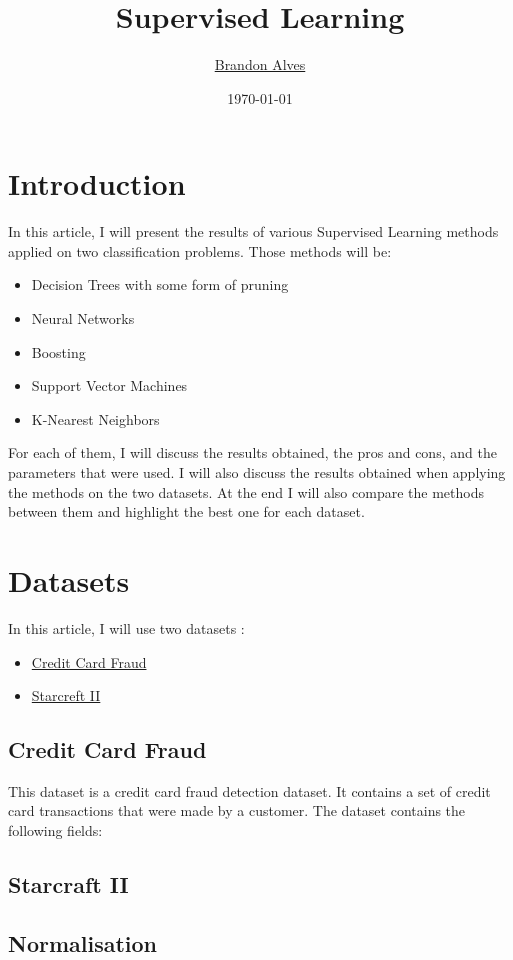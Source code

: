\documentclass[twocolumn, a4paper, 10pt]{article}
\title{
    Supervised Learning
}
\author{
    \href{mailto:brandon.alves@gatech.edu}{Brandon Alves}
}
\date{\today}
\begin{document}
    \maketitle
    \tableofcontents
	\listoffigures
	\section{Introduction}
		In this article, I will present the results of various Supervised Learning methods applied on two classification problems. Those methods will be:
		\begin{itemize}
			\item Decision Trees with some form of pruning
			\item Neural Networks
			\item Boosting
			\item Support Vector Machines
			\item K-Nearest Neighbors
		\end{itemize}
		For each of them, I will discuss the results obtained, the pros and cons, and the parameters that were used. I will also discuss the results obtained when applying the methods on the two datasets. At the end I will also compare the methods between them and highlight the best one for each dataset.
	\section{Datasets}
		In this article, I will use two datasets :
		\begin{itemize}
			\item \href{https://www.kaggle.com/code/sngkadam/credit-card-fraud-detection/data}{Credit Card Fraud}
			\item \href{https://www.kaggle.com/c/the-insa-starcraft-2-player-prediction-challenge/data}{Starcreft II}
		\end{itemize}
		\subsection{Credit Card Fraud}
			This dataset is a credit card fraud detection dataset. It contains a set of credit card transactions that were made by a customer. The dataset contains the following fields:
		\subsection{Starcraft II}
		\subsection*{Normalisation}
\end{document}
